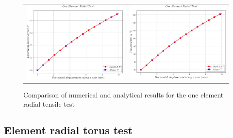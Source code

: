 \begin{figure}[h]
\begin{centering}
\begin{tabular}{cc}
\includegraphics[width=0.45\columnwidth]{Figures/Samples/Element/Radial_plasticStrain} & \includegraphics[width=0.45\columnwidth]{Figures/Samples/Element/Radial_temperature}\tabularnewline
\end{tabular}
\par\end{centering}
\caption{Comparison of numerical and analytical results for the one element
radial tensile test\label{fig:Samples!Single!Radial-Comparison}}
\end{figure}
\clearpage

\subsection{Element radial torus test}

